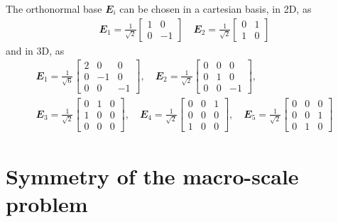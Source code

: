 \documentclass[12pt,review]{elsarticle}
\renewcommand{\ts}[1]{\mathbfit{#1}}
\begin{document}
The orthonormal base $\ts E_i$ can be chosen in a cartesian basis, in 2D, as
\begin{align}
 \ts E_1 = \frac{1}{\sqrt{2}}\begin{bmatrix} 1 & 0\\ 0 & -1\end{bmatrix}\quad \ts E_2 = \frac{1}{\sqrt{2}}\begin{bmatrix} 0 & 1\\ 1 & 0\end{bmatrix}
\end{align}
and in 3D, as
\begin{equation}
\begin{gathered}
 \ts E_1 = \frac{1}{\sqrt{6}}\left[\begin{smallmatrix} 2 & 0 & 0\\ 0 & -1 & 0\\ 0 & 0 & -1\end{smallmatrix}\right],\quad
 \ts E_2 = \frac{1}{\sqrt{2}}\left[\begin{smallmatrix} 0 & 0 & 0\\ 0 & 1 & 0 \\ 0 & 0 & -1\end{smallmatrix}\right],\\
 \ts E_3 = \frac{1}{\sqrt{2}}\left[\begin{smallmatrix} 0 & 1 & 0\\ 1 & 0 & 0 \\ 0 & 0 & 0\end{smallmatrix}\right],\quad
 \ts E_4 = \frac{1}{\sqrt{2}}\left[\begin{smallmatrix} 0 & 0 & 1\\ 0 & 0 & 0 \\ 1 & 0 & 0\end{smallmatrix}\right],\quad
 \ts E_5 = \frac{1}{\sqrt{2}}\left[\begin{smallmatrix} 0 & 0 & 0\\ 0 & 0 & 1 \\ 0 & 1 & 0\end{smallmatrix}\right]
\end{gathered}
\end{equation}


\section{Symmetry of the macro-scale problem}
\end{document}

